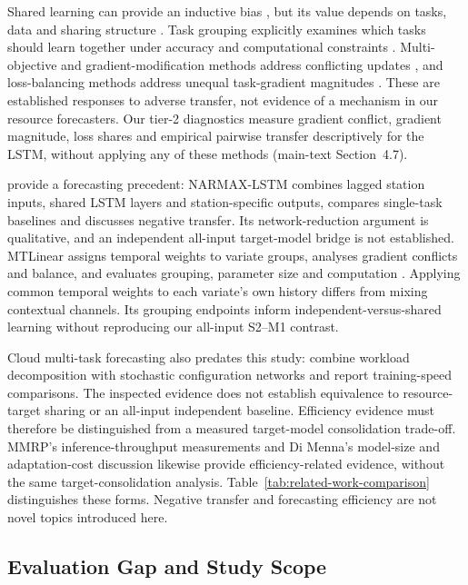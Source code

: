 \documentclass[a4paper,11pt]{article}
\begin{document}
Shared learning can provide an inductive bias \citep{Caruana1997Multitask},
but its value depends on tasks, data and sharing structure
\citep{Yu2025MultitaskFundamentals}. Task grouping explicitly examines which
tasks should learn together under accuracy and computational constraints
\citep{Standley2020TaskGrouping,Fifty2021TaskGroupings}.
Multi-objective and gradient-modification methods address conflicting updates
\citep{Sener2018MultiObjective,Yu2020GradientSurgery}, and loss-balancing
methods address unequal task-gradient magnitudes \citep{Chen2018GradNorm}.
These are established responses to adverse transfer, not evidence of a
mechanism in our resource forecasters. Our tier-2 diagnostics measure
gradient conflict, gradient magnitude, loss shares and empirical pairwise
transfer descriptively for the LSTM, without applying any of these methods
(main-text Section~4.7).

\citet{Nikentari2022NARMAXLSTM} provide a forecasting precedent:
NARMAX-LSTM combines lagged station inputs, shared LSTM layers and
station-specific outputs, compares single-task baselines and discusses
negative transfer. Its network-reduction argument is qualitative,
and an independent all-input target-model bridge is not established.
MTLinear assigns temporal weights to variate groups, analyses gradient
conflicts and balance, and evaluates grouping, parameter size and computation
\citep{Nochumsohn2025MTLinear}. Applying common temporal weights to each
variate's own history differs from mixing contextual channels. Its grouping
endpoints inform independent-versus-shared learning without reproducing our
all-input S2--M1 contrast.

Cloud multi-task forecasting also predates this study:
\citet{Bi2019CloudMultitask} combine workload decomposition with stochastic
configuration networks and report training-speed comparisons. The inspected
evidence does not establish equivalence to resource-target sharing or an
all-input independent baseline. Efficiency evidence must therefore be
distinguished from a measured target-model consolidation trade-off.
MMRP's inference-throughput measurements and Di Menna's model-size and
adaptation-cost discussion likewise provide efficiency-related evidence,
without the same target-consolidation analysis.
Table~\ref{tab:related-work-comparison} distinguishes these forms.
Negative transfer and forecasting efficiency are not novel topics introduced here.

\subsection*{Evaluation Gap and Study Scope}
\end{document}

